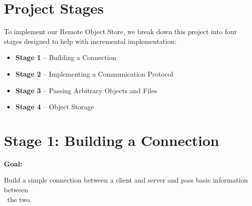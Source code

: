 \documentclass{article}
\begin{document}

\section{Project Stages} %

To implement our Remote Object Store, we break down this project into four stages designed to help with incremental implementation:
\begin{itemize}  
\item \textbf{Stage 1} – Building a Connection
\item \textbf{Stage 2} – Implementing a Communication Protocol
\item \textbf{Stage 3} – Passing Arbitrary Objects and Files
\item \textbf{Stage 4} – Object Storage
\end{itemize}

\section{Stage 1: Building a Connection} %


\begin{large}\textbf{Goal:}\end{large} Build a simple connection between a client and server and pass basic information between\\ \indent \indent \-\ the two.
\end{document}
